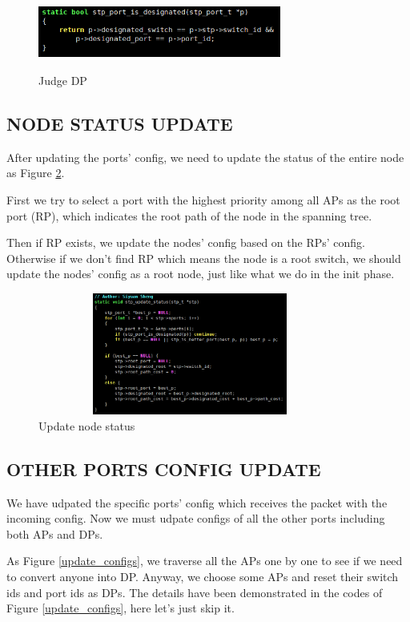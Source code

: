 \documentclass{article}
\begin{document}
\begin{figure}
	\centering
	\includegraphics[width=8cm, height=2.5cm]{is_designated.png}
	\caption{Judge DP}
	\label{is_designated}
\end{figure}

\subsection{NODE STATUS UPDATE}

After updating the ports' config, we need to update the status of the entire node as Figure \ref{update_status}.

First we try to select a port with the highest priority among all APs as the root port (RP), which indicates the root path of the node in the spanning tree.

Then if RP exists, we update the nodes' config based on the RPs' config. Otherwise if we don't find RP which means the node is a root switch, we should update the nodes' config as a root node, just like what we do in the init phase.

\begin{figure}
	\centering
	\includegraphics[width=10cm, height=4cm]{update_status.png}
	\caption{Update node status}
	\label{update_status}
\end{figure}

\subsection{OTHER PORTS CONFIG UPDATE}

We have udpated the specific ports' config which receives the packet with the incoming config.
Now we must udpate configs of all the other ports including both APs and DPs.

As Figure \ref{update_configs}, we traverse all the APs one by one to see if we need to convert anyone into DP. Anyway, we choose some APs and reset their switch ids and port ids as DPs. The details have been demonstrated in the codes of Figure \ref{update_configs}, here let's just skip it.
\end{document}
